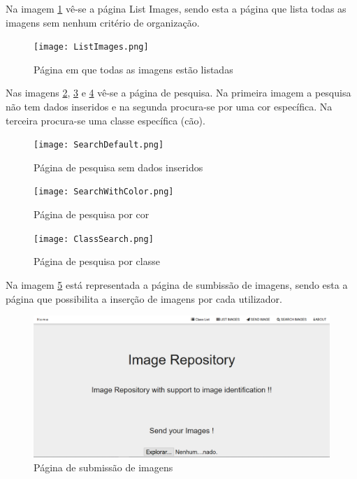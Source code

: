\documentclass{report}
\begin{document}
 Na imagem \ref{Fig5} vê-se a página List Images, sendo esta a página que lista todas as imagens sem nenhum critério de organização.

\begin{figure}[H]
\texttt{[image: ListImages.png]}
\caption{Página em que todas as imagens estão listadas}
\label{Fig5}
\end{figure}

Nas imagens \ref{Fig6}, \ref{Fig7} e \ref{Fig8} vê-se a página de pesquisa. Na primeira imagem a pesquisa não tem dados inseridos e na segunda procura-se por uma cor específica. Na terceira procura-se uma classe específica (cão).

\begin{figure}[H]
\texttt{[image: SearchDefault.png]}
\caption{Página de pesquisa sem dados inseridos}
\label{Fig6}
\end{figure}

\begin{figure}[H]
\texttt{[image: SearchWithColor.png]}
\caption{Página de pesquisa por cor}
\label{Fig7}
\end{figure}

\begin{figure}[H]
\texttt{[image: ClassSearch.png]}
\caption{Página de pesquisa por classe}
\label{Fig8}
\end{figure}

Na imagem \ref{Fig9} está representada a página de sumbissão de imagens, sendo esta a página que possibilita a inserção de imagens por cada utilizador.

\begin{figure}[H]
\includegraphics[width=\textwidth]{Send.png}
\caption{Página de submissão de imagens}
\label{Fig9}
\end{figure}
\end{document}
